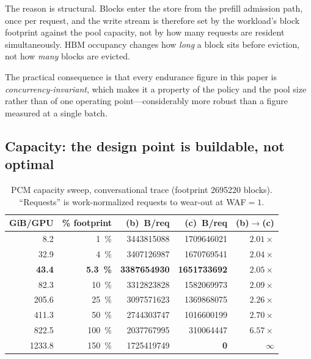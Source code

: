 \documentclass[conference]{IEEEtran}
\newcommand{\cfgb}{\textsf{(b)}}
\newcommand{\cfgc}{\textsf{(c)}}
\begin{document}
The reason is structural. Blocks enter the store from the prefill admission
path, once per request, and the write stream is therefore set by the workload's
block footprint against the pool capacity, not by how many requests are resident
simultaneously. HBM occupancy changes how \emph{long} a block sits before
eviction, not how \emph{many} blocks are evicted.

The practical consequence is that every endurance figure in this paper is
\emph{concurrency-invariant}, which makes it a property of the policy and the
pool size rather than of one operating point---considerably more robust than a
figure measured at a single batch.

\subsection{Capacity: the design point is buildable, not optimal}\label{sec:capacity}

\begin{table}[t]
\centering
\caption{PCM capacity sweep, conversational trace (footprint
\num{2695220} blocks). ``Requests'' is work-normalized requests to wear-out
at WAF${=}1$.}
\label{tab:capacity}
\small
\begin{tabular}{rrrrr}
\toprule
\textbf{GiB/GPU} & \textbf{\% footprint} & \textbf{\cfgb\ B/req} & \textbf{\cfgc\ B/req} & \textbf{\cfgb$\to$\cfgc} \\
\midrule
8.2   & \SI{1}{\percent}   & \num{3443815088} & \num{1709646021} & $2.01\times$ \\
32.9  & \SI{4}{\percent}   & \num{3407126987} & \num{1670769541} & $2.04\times$ \\
\textbf{43.4} & \textbf{\SI{5.3}{\percent}} & \textbf{\num{3387654930}} & \textbf{\num{1651733692}} & $\mathbf{2.05\times}$ \\
82.3  & \SI{10}{\percent}  & \num{3312823828} & \num{1582069973} & $2.09\times$ \\
205.6 & \SI{25}{\percent}  & \num{3097571623} & \num{1369868075} & $2.26\times$ \\
411.3 & \SI{50}{\percent}  & \num{2744303747} & \num{1016600199} & $2.70\times$ \\
822.5 & \SI{100}{\percent} & \num{2037767995} & \num{310064447}  & $6.57\times$ \\
1233.8 & \SI{150}{\percent} & \num{1725419749} & \textbf{0} & $\infty$ \\
\bottomrule
\end{tabular}
\end{table}
\end{document}
